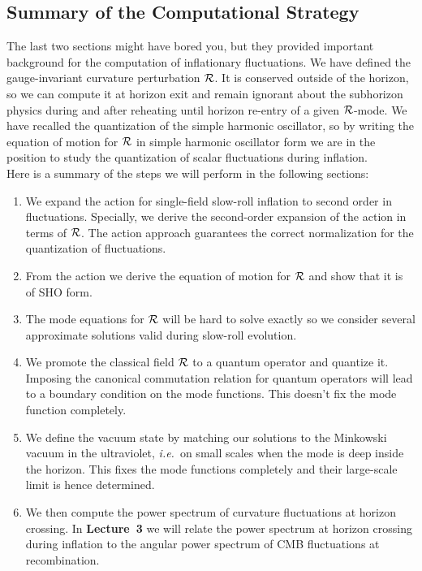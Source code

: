 \documentclass[12pt,letterpaper,rotate]{article}
\begin{document}
{\subsection{Summary of the Computational Strategy}

The last two sections might have bored you, but they provided important background for the computation of inflationary fluctuations.
We have defined the gauge-invariant curvature perturbation ${\cal R}$. It is conserved outside of the horizon, so we can compute it at horizon exit and remain ignorant about the subhorizon physics during and after reheating until horizon re-entry of a given ${\cal R}$-mode.
We have recalled the quantization of the simple harmonic oscillator, so by writing the equation of motion for ${\cal R}$ in simple harmonic oscillator form we are in the position to study the quantization of scalar fluctuations during inflation.\\

Here is a summary of the steps we will perform in the following sections:

\begin{enumerate}
\item We expand the action for single-field slow-roll inflation to second order in fluctuations.
Specially, we derive the second-order expansion of the action in terms of ${\cal R}$.
The action approach guarantees the correct normalization for the quantization of fluctuations.
\item From the action we derive the equation of motion for ${\cal R}$ and show that it is of SHO form.
\item The mode equations for ${\cal R}$ will be hard to solve exactly so we consider several approximate solutions valid during slow-roll evolution.
\item We promote the classical field ${\cal R}$ to a quantum operator and quantize it.  
Imposing the canonical commutation relation for quantum operators will lead to a boundary condition on the mode functions.  This doesn't fix the mode function completely. 
\item We define the vacuum state by matching our solutions to the Minkowski vacuum in the ultraviolet, {\it i.e.}~on small scales when the mode is deep inside the horizon.
This fixes the mode functions completely and their large-scale limit is hence determined.
\item We then compute the power spectrum of curvature fluctuations at horizon crossing. In {\bf Lecture~3} we will relate the power spectrum at horizon crossing during inflation to the angular power spectrum of CMB fluctuations at recombination.
\end{enumerate}

}
\end{document}
